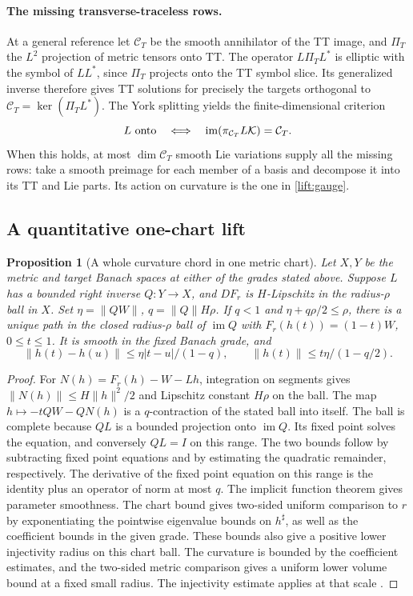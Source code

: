 \documentclass[11pt]{article}
\numberwithin{equation}{section}
\newtheorem{proposition}[theorem]{Proposition}
\theoremstyle{definition}
\theoremstyle{remark}
\begin{document}
\paragraph{The missing transverse-traceless rows.}
At a general reference let \(\mathcal C_T\) be the smooth
annihilator of the TT image, and \(\Pi_T\) the \(L^2\) projection
of metric tensors onto TT. The operator \(L\Pi_TL^*\) is elliptic
with the symbol of \(LL^*\), since \(\Pi_T\) projects onto the TT
symbol slice. Its generalized inverse therefore gives TT solutions
for precisely the targets orthogonal to \(\mathcal C_T=\ker(\Pi_T L^*)\).
The York splitting yields the finite-dimensional criterion
\[
 L\ {\rm onto}\quad\Longleftrightarrow\quad
 \operatorname{im}(\pi_{\mathcal C_T}L\mathcal K)=\mathcal C_T .
\]
When this holds, at most \(\dim\mathcal C_T\) smooth Lie variations
supply all the missing rows: take a smooth preimage for each member
of a basis and decompose it into its TT and Lie parts. Its action
on curvature is the one in \eqref{lift:gauge}.

\subsection{A quantitative one-chart lift}

\begin{proposition}[A whole curvature chord in one metric chart]\label{lift:radial}
Let \(X,Y\) be the metric and target Banach spaces at either of the
grades stated above. Suppose \(L\) has a bounded right inverse
\(Q:Y\to X\), and \(DF_r\) is \(H\)-Lipschitz in the radius-\(\rho\)
ball in \(X\). Set \(\eta=\|QW\|\), \(q=\|Q\|H\rho\).
If \(q<1\) and \(\eta+q\rho/2\le\rho\), there is a unique
path in the closed radius-\(\rho\) ball of \(\operatorname{im}Q\)
with \(F_r(h(t))=(1-t)W\), \(0\le t\le1\). It is smooth in the
fixed Banach grade, and
\[
 \|h(t)-h(u)\|\le\eta|t-u|/(1-q),\qquad
 \|h(t)\|\le t\eta/(1-q/2).
\]
\end{proposition}

\begin{proof}
For \(N(h)=F_r(h)-W-Lh\), integration on segments gives
\(\|N(h)\|\le H\|h\|^2/2\) and Lipschitz constant \(H\rho\)
on the ball. The map \(h\mapsto-tQW-QN(h)\) is a
\(q\)-contraction of the stated ball into itself. The ball is
complete because \(QL\) is a bounded projection onto
\(\operatorname{im}Q\). Its fixed point solves the equation, and
conversely \(QL=I\) on this range. The two bounds follow by subtracting
fixed point equations and by estimating the quadratic remainder,
respectively. The derivative of the fixed point equation on
this range is the identity plus an operator of norm at most \(q\).
The implicit function theorem gives parameter smoothness.
The chart bound gives two-sided uniform comparison to \(r\) by
exponentiating the pointwise eigenvalue bounds on \(h^\sharp\),
as well as the coefficient bounds in the given grade. These bounds also
give a positive lower injectivity radius on this chart ball. The
curvature is bounded by the coefficient estimates, and the two-sided
metric comparison gives a uniform lower volume bound at a fixed small
radius. The injectivity estimate applies at that scale
\cite[Theorem 4.7]{CheegerGromovTaylor1982}.
\end{proof}
\end{document}
